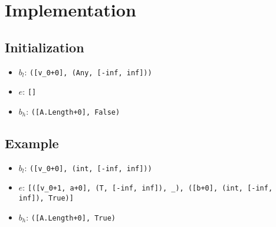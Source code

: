 \documentclass[11pt]{article}
\begin{document}
\section{Implementation}

\subsection{Initialization}

\begin{itemize}
\item $b_l$: \verb|([v_0+0], (Any, [-inf, inf]))|
\item $e$: \verb|[]|
\item $b_h$: \verb|([A.Length+0], False)|
\end{itemize}

\subsection{Example}

\begin{itemize}
\item $b_l$: \verb|([v_0+0], (int, [-inf, inf]))|
\item $e$: \verb|[([v_0+1, a+0], (T, [-inf, inf]), _), ([b+0], (int, [-inf, inf]), True)]|
\item $b_h$: \verb|([A.Length+0], True)|
\end{itemize}
\end{document}
